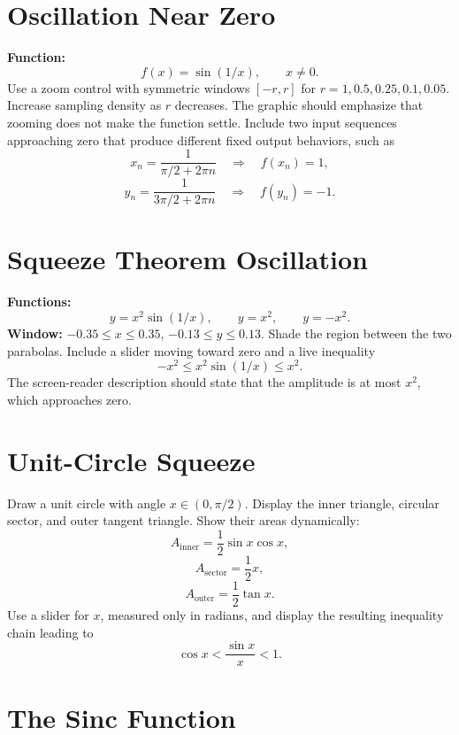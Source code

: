 \documentclass[11pt,openany]{book}
\theoremstyle{bgplain}
\begin{document}
\section{Oscillation Near Zero}

\begin{bggraphspec}
\textbf{Function:}
\[
  f(x)=\sin(1/x),\qquad x\ne0.
\]
Use a zoom control with symmetric windows \([-r,r]\) for \(r=1,0.5,0.25,0.1,0.05\). Increase sampling density as \(r\) decreases. The graphic should emphasize that zooming does not make the function settle. Include two input sequences approaching zero that produce different fixed output behaviors, such as
\[
  x_n=\frac{1}{\pi/2+2\pi n}\quad\Rightarrow\quad f(x_n)=1,
\]
\[
  y_n=\frac{1}{3\pi/2+2\pi n}\quad\Rightarrow\quad f(y_n)=-1.
\]
\end{bggraphspec}

\section{Squeeze Theorem Oscillation}

\begin{bggraphspec}
\textbf{Functions:}
\[
  y=x^2\sin(1/x),\qquad y=x^2,\qquad y=-x^2.
\]
\textbf{Window:} \(-0.35\le x\le0.35\), \(-0.13\le y\le0.13\). Shade the region between the two parabolas. Include a slider moving toward zero and a live inequality
\[
  -x^2\le x^2\sin(1/x)\le x^2.
\]
The screen-reader description should state that the amplitude is at most \(x^2\), which approaches zero.
\end{bggraphspec}

\section{Unit-Circle Squeeze}

\begin{bggraphspec}
Draw a unit circle with angle \(x\in(0,\pi/2)\). Display the inner triangle, circular sector, and outer tangent triangle. Show their areas dynamically:
\[
  A_{\mathrm{inner}}=\frac12\sin x\cos x,
\]
\[
  A_{\mathrm{sector}}=\frac12x,
\]
\[
  A_{\mathrm{outer}}=\frac12\tan x.
\]
Use a slider for \(x\), measured only in radians, and display the resulting inequality chain leading to
\[
  \cos x<\frac{\sin x}{x}<1.
\]
\end{bggraphspec}

\section{The Sinc Function}
\end{document}
